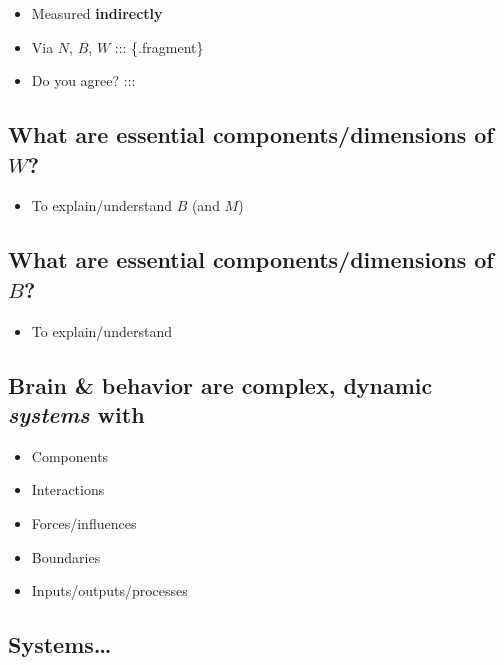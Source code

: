 \documentclass[
  letterpaper,
  DIV=11,
  numbers=noendperiod]{scrartcl}
\providecommand{\tightlist}{%
  \setlength{\itemsep}{0pt}\setlength{\parskip}{0pt}}
\begin{document}
\begin{itemize}
\tightlist
\item
  Measured \textbf{indirectly}
\item
  Via \(N\), \(B\), \(W\) ::: \{.fragment\}
\item
  Do you agree? :::
\end{itemize}

\subsection{\texorpdfstring{What are essential components/dimensions of
\(W\)?}{What are essential components/dimensions of W?}}\label{what-are-essential-componentsdimensions-of-w}

\begin{itemize}
\tightlist
\item
  To explain/understand \(B\) (and \(M\))
\end{itemize}

\subsection{\texorpdfstring{What are essential components/dimensions of
\(B\)?}{What are essential components/dimensions of B?}}\label{what-are-essential-componentsdimensions-of-b}

\begin{itemize}
\tightlist
\item
  To explain/understand
\end{itemize}

\subsection{\texorpdfstring{Brain \& behavior are complex, dynamic
\emph{systems}
with}{Brain \& behavior are complex, dynamic systems with}}\label{brain-behavior-are-complex-dynamic-systems-with}

\begin{itemize}
\tightlist
\item
  Components
\item
  Interactions
\item
  Forces/influences
\item
  Boundaries
\item
  Inputs/outputs/processes
\end{itemize}

\subsection{Systems\ldots{}}\label{systems}
\end{document}

